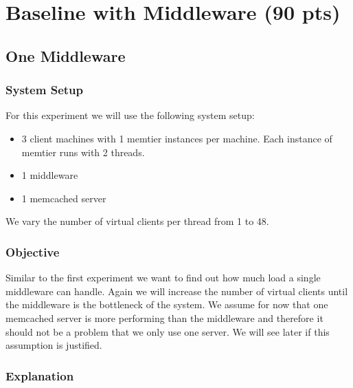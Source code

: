 \documentclass[11pt,a4paper]{article}
\begin{document}
\section{Baseline with Middleware (90 pts)}
%
\subsection{One Middleware}
%
\subsubsection{System Setup}
%
For this experiment we will use the following system setup:
%
\begin{itemize}
	\item 3 client machines with 1 memtier instances per machine. Each instance of memtier runs with 2 threads.
	\item 1 middleware
	\item 1 memcached server
\end{itemize}
%
We vary the number of virtual clients per thread from 1 to 48.
%
\subsubsection{Objective}
%
Similar to the first experiment we want to find out how much load a single middleware can handle. 
%
Again we will increase the number of virtual clients until the middleware is the bottleneck of the system.
%
We assume for now that one memcached server is more performing than the middleware and therefore it should not be a problem that we only use one server.
%
We will see later if this assumption is justified.
%
\subsubsection{Explanation}
%
\end{document}
